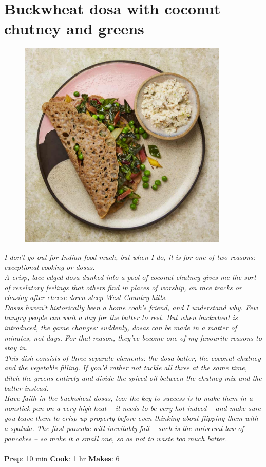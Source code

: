 \documentclass{book}
\begin{document}
\section{Buckwheat dosa with coconut chutney and greens}
\begin{figure}
\centering\includegraphics[width=10cm,height=10cm,keepaspectratio]{Recipe_Pictures/Buckwheat_dosa_with_coconut_chutney_and_greens.png}
\end{figure}
\emph{I don’t go out for Indian food much, but when I do, it is for one of two reasons: exceptional cooking or dosas. \\ 
A crisp, lace-edged dosa dunked into a pool of coconut chutney gives me the sort of revelatory feelings that others find in places of worship, on race tracks or chasing after cheese down steep West Country hills. \\ 
Dosas haven’t historically been a home cook’s friend, and I understand why. Few hungry people can wait a day for the batter to rest. But when buckwheat is introduced, the game changes: suddenly, dosas can be made in a matter of minutes, not days. For that reason, they’ve become one of my favourite reasons to stay in.\\ 
This dish consists of three separate elements: the dosa batter, the coconut chutney and the vegetable filling. If you’d rather not tackle all three at the same time, ditch the greens entirely and divide the spiced oil between the chutney mix and the batter instead. \\ 
Have faith in the buckwheat dosas, too: the key to success is to make them in a nonstick pan on a very high heat – it needs to be very hot indeed – and make sure you leave them to crisp up properly before even thinking about flipping them with a spatula. The first pancake will inevitably fail – such is the universal law of pancakes – so make it a small one, so as not to waste too much batter.}\\\\ 
\textbf{Prep}: 10 min
\textbf{Cook}: 1 hr
\textbf{Makes}: 6
\end{document}
